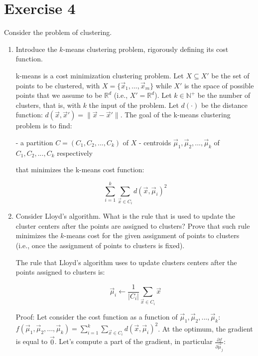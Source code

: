 \documentclass[a4paper,11pt,oneside]{book}
\begin{document}
\section{Exercise 4}
Consider the problem of clustering.
\begin{enumerate}
    \item Introduce the $k$-means clustering problem, rigorously defining its cost function.
        \begin{solution}
            k-means is a cost minimization clustering problem. Let $X \subseteq X'$ be the set of points to be clustered, with $X = \{\vec{x}_1,...,\vec{x}_m\}$ while $X'$ is the space of possible points that we assume to be $\mathbb{R}^d$ (i.e., $X' = \mathbb{R}^d$). Let $k \in \mathbb{N}^+$ be the number of clusters, that is, with $k$ the input of the problem. Let $d(\cdot)$ be the distance function: $d(\vec{x},\vec{x}') = \|\vec{x}-\vec{x}'\|$. The goal of the k-means clustering problem is to find:
            
            - a partition $C = (C_1,C_2,...,C_k)$ of $X$
            - centroids $\vec{\mu}_1,\vec{\mu}_2,...,\vec{\mu}_k$ of $C_1,C_2,...,C_k$ respectively
            
            that minimizes the k-means cost function:
            
            $$\sum_{i=1}^k \sum_{\vec{x}\in C_i} d(\vec{x},\vec{\mu}_i)^2$$
        \end{solution}
        
    \item Consider Lloyd's algorithm. What is the rule that is used to update the cluster centers after the points are assigned to clusters? Prove that such rule minimizes the $k$-means cost for the given assignment of points to clusters (i.e., once the assignment of points to clusters is fixed).
        \begin{solution}
            The rule that Lloyd's algorithm uses to update clusters centers after the points assigned to clusters is:
            
            $$\vec{\mu}_i \leftarrow \frac{1}{|C_i|} \sum_{\vec{x}\in C_i} \vec{x}$$
            
            Proof: Let consider the cost function as a function of $\vec{\mu}_1,\vec{\mu}_2,...,\vec{\mu}_k$: $f(\vec{\mu}_1,\vec{\mu}_2,...,\vec{\mu}_k) = \sum_{i=1}^k \sum_{\vec{x}\in C_i} d(\vec{x},\vec{\mu}_i)^2$. At the optimum, the gradient is equal to $\vec{0}$. Let's compute a part of the gradient, in particular $\frac{\partial f}{\partial \vec{\mu}_j}$:
            

\end{solution}
\end{enumerate}
\end{document}
